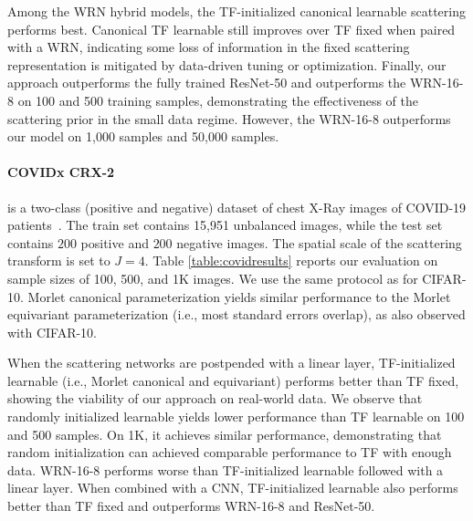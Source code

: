 \documentclass[10pt,twocolumn,letterpaper]{article}
\begin{document}
Among the WRN hybrid models, the TF-initialized canonical learnable scattering performs best.  Canonical TF learnable still improves over TF fixed when paired with a WRN, indicating some loss of information in the fixed scattering representation is mitigated by data-driven tuning or optimization. Finally, our approach outperforms the fully trained ResNet-50 and outperforms the WRN-16-8 on 100 and 500 training samples, demonstrating the effectiveness of the scattering prior in the small data regime. However, the WRN-16-8 outperforms our model on 1,000 samples and 50,000 samples.


 \vspace{-10pt}
\paragraph{COVIDx CRX-2} \hspace{-8pt}
\label{section-covid} is a two-class (positive and negative) dataset of chest X-Ray images of COVID-19 patients~\cite{Wang2020}. The train set contains 15,951 unbalanced images, while the test set contains $200$ positive and $200$ negative images. The spatial scale of the scattering transform is set to $J=4$. Table \ref{table:covidresults} reports our evaluation on sample sizes of 100, 500, and 1K images. We use the same protocol as for CIFAR-10. Morlet canonical parameterization yields similar performance to the Morlet equivariant parameterization (i.e., most standard errors overlap), as also observed with CIFAR-10.

When the scattering networks are postpended with a linear layer, TF-initialized learnable (i.e., Morlet canonical and equivariant) performs better than TF fixed, showing the viability of our approach on real-world data. We observe that randomly initialized learnable yields lower performance than TF learnable on 100 and 500 samples. On 1K, it achieves similar performance, demonstrating that random initialization can achieved comparable performance to TF with enough data.  WRN-16-8 performs worse than TF-initialized learnable followed with a linear layer. When combined with a CNN,  TF-initialized learnable also performs better than TF fixed and outperforms WRN-16-8 and ResNet-50.
\vspace{-10pt}
\end{document}
